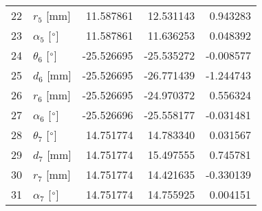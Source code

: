 \documentclass{standalone}%
\begin{document}
\begin{tabular}{llrrr}
22 &              $r_{5}$ [mm] &  11.587861 &  12.531143 &   0.943283 \\
23 &  $\alpha_{5}$ [$\degree$] &  11.587861 &  11.636253 &   0.048392 \\
24 &  $\theta_{6}$ [$\degree$] & -25.526695 & -25.535272 &  -0.008577 \\
25 &              $d_{6}$ [mm] & -25.526695 & -26.771439 &  -1.244743 \\
26 &              $r_{6}$ [mm] & -25.526695 & -24.970372 &   0.556324 \\
27 &  $\alpha_{6}$ [$\degree$] & -25.526696 & -25.558177 &  -0.031481 \\
28 &  $\theta_{7}$ [$\degree$] &  14.751774 &  14.783340 &   0.031567 \\
29 &              $d_{7}$ [mm] &  14.751774 &  15.497555 &   0.745781 \\
30 &              $r_{7}$ [mm] &  14.751774 &  14.421635 &  -0.330139 \\
31 &  $\alpha_{7}$ [$\degree$] &  14.751774 &  14.755925 &   0.004151 \\
\bottomrule
\end{tabular}
%
\end{document}
